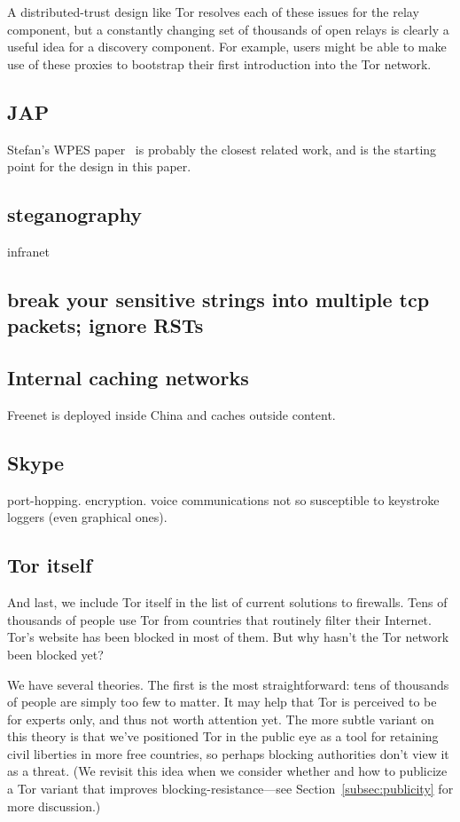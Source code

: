 \documentclass{llncs}
\begin{document}
A distributed-trust design like Tor resolves each of these issues for
the relay component, but a constantly changing set of thousands of open
relays is clearly a useful idea for a discovery component. For example,
users might be able to make use of these proxies to bootstrap their
first introduction into the Tor network.

\subsection{JAP}

Stefan's WPES paper~\cite{koepsell:wpes2004} is probably the closest
related work, and is
the starting point for the design in this paper.

\subsection{steganography}

infranet

\subsection{break your sensitive strings into multiple tcp packets;
ignore RSTs}

\subsection{Internal caching networks}

Freenet is deployed inside China and caches outside content.

\subsection{Skype}

port-hopping. encryption. voice communications not so susceptible to
keystroke loggers (even graphical ones).


\subsection{Tor itself}

And last, we include Tor itself in the list of current solutions
to firewalls. Tens of thousands of people use Tor from countries that
routinely filter their Internet. Tor's website has been blocked in most
of them. But why hasn't the Tor network been blocked yet?

We have several theories. The first is the most straightforward: tens of
thousands of people are simply too few to matter. It may help that Tor is
perceived to be for experts only, and thus not worth attention yet. The
more subtle variant on this theory is that we've positioned Tor in the
public eye as a tool for retaining civil liberties in more free countries,
so perhaps blocking authorities don't view it as a threat. (We revisit
this idea when we consider whether and how to publicize a Tor variant
that improves blocking-resistance---see Section~\ref{subsec:publicity}
for more discussion.)
\end{document}
